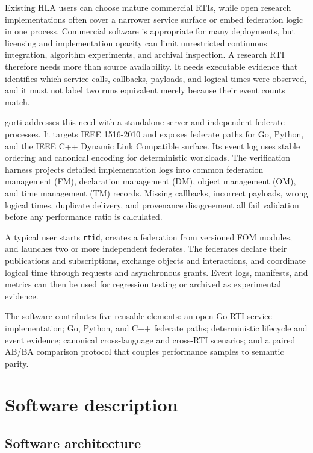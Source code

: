 \documentclass[preprint,12pt,a4paper]{elsarticle}
\begin{document}
Existing HLA users can choose mature commercial RTIs, while open research
implementations often cover a narrower service surface or embed federation
logic in one process. Commercial software is appropriate for many deployments,
but licensing and implementation opacity can limit unrestricted continuous
integration, algorithm experiments, and archival inspection. A research RTI
therefore needs more than source availability. It needs executable evidence
that identifies which service calls, callbacks, payloads, and logical times
were observed, and it must not label two runs equivalent merely because their
event counts match.

gorti addresses this need with a standalone server and independent federate
processes. It targets IEEE 1516-2010 and exposes federate paths for Go, Python,
and the IEEE C++ Dynamic Link Compatible surface. Its event log uses stable
ordering and canonical encoding for deterministic workloads. The verification
harness projects detailed implementation logs into common federation
management (FM), declaration management (DM), object management (OM), and time
management (TM) records. Missing callbacks, incorrect payloads, wrong logical
times, duplicate delivery, and provenance disagreement all fail validation
before any performance ratio is calculated.

A typical user starts \texttt{rtid}, creates a federation from versioned FOM
modules, and launches two or more independent federates. The federates declare
their publications and subscriptions, exchange objects and interactions, and
coordinate logical time through requests and asynchronous grants. Event logs,
manifests, and metrics can then be used for regression testing or archived as
experimental evidence.

The software contributes five reusable elements: an open Go RTI service
implementation; Go, Python, and C++ federate paths; deterministic lifecycle and
event evidence; canonical cross-language and cross-RTI scenarios; and a paired
AB/BA comparison protocol that couples performance samples to semantic parity.

\section{Software description}
\label{sec:description}

\subsection{Software architecture}
\end{document}
